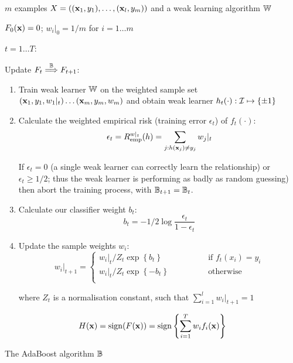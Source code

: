 \begin{linefigure}
\label{fig:boosting algorithm}
 $m$ examples $X = ((\mathbf{x}_1, y_1), \ldots, (\mathbf{x}_l,
y_m))$ and a weak learning algorithm $\mathbb{W}$
\par
{} $F_0(\mathbf{x}) = 0$; $w_i|_0 = 1/m$ for
$i=1 \ldots m$ 
\par
{} $t=1 \ldots T$:
\par
\noindent Update $F_t \stackrel{\mathbb{B}}{\Longrightarrow} F_{t+1}$: 
\par
\begin{enumerate}

\item	Train weak learner $\mathbb{W}$ on the weighted sample set 
	$(\mathbf{x}_1, y_1, w_1|_t) \ldots (\mathbf{x}_m, y_m, w_m)$
	and obtain weak learner $h_t(\cdot) : \mathcal{I} \mapsto \{\pm 1\}$

\item	Calculate the weighted empirical risk (training error
	$\epsilon_t$) of $f_t(\cdot)$: 
	\begin{equation}
	\epsilon_t = R_{\mathrm{emp}}^{w|_t}(h) = \sum_{j : h(\mathbf{x}_j) \neq
	y_j} w_j|_t
	\end{equation}

	If $\epsilon_t = 0$ (a single weak learner can correctly learn
	the relationship) or $\epsilon_t \geq 1/2$; thus the weak
	learner is performing as badly as random guessing) then abort
	the training process, with $\mathbb{B}_{t+1} = \mathbb{B}_{t}$.

\item	Calculate our classifier weight $b_t$:
	\begin{equation}
	b_t = - 1/2 \log \frac{\epsilon_t}{1 - \epsilon_t}
	\end{equation}

\item	Update the sample weights $w_i$:
	\begin{equation}
	w_i|_{t+1} = \left\{
	\begin{array}{cl}
		w_i|_t / Z_t \exp \left\{ b_t \right\}&	\qquad \qquad \mbox{if
		$f_t(x_i) = y_i$} \\
		w_i|_t / Z_t \exp \left\{ -b_t \right\} & \qquad \qquad
		\mbox{otherwise} \\
	\end{array} \right.
	\label{eqn:sample weight update}
	\end{equation}

	where $Z_t$ is a normalisation constant, such that
	$\sum_{i=1}^{l} w_i|_{t+1} = 1$
\end{enumerate}

\par
{} 
\begin{equation}
H(\mathbf{x}) = \mathrm{sign} (F(\mathbf{x})) = \mathrm{sign} \left\{ \sum_{i=1}^T w_i f_i(\mathbf{x}) \right\}
\end{equation}
\caption{The AdaBoost algorithm $\mathbb{B}$}
\end{linefigure}


